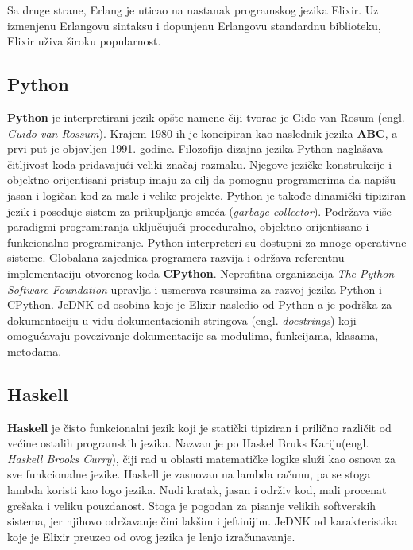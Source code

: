 \documentclass[12pt,oneside]{memoir}
\begin{document}
Sa druge strane, Erlang je uticao na nastanak programskog jezika Elixir. Uz izmenjenu Erlangovu sintaksu i dopunjenu Erlangovu standardnu biblioteku, Elixir uživa široku popularnost.
     
\begin{comment} U funkcionalnom programiranju, funkcije se primenjuju na argumente i vrednosti. Vraćene vrednosti se koriste kao argumenti za druge funkcije. Funkcionalno programiranje je suprotno proceduralnom programiranju, gde se koriste naredbe koje menjaju okruženje programa na neki način, kao što je pripisivanje vrednosti promenljivim. U funkcionalnom programiranju, te promene okruženja se minimizuju korišćenjem vrednosti koje vraća pozvana funkcija kao direktan ulaz u drugu funkciju, bez upotrebe pripisivanja naredbi.\\
\end{comment}

\subsection{Python}
\textbf{Python} je interpretirani jezik opšte namene čiji tvorac je Gido van Rosum (engl. \textit{Guido van Rossum}). Krajem 1980-ih je koncipiran kao naslednik jezika \textbf{ABC}, a prvi put je objavljen 1991. godine. Filozofija dizajna jezika Python naglašava čitljivost koda pridavajući veliki značaj razmaku. Njegove jezičke konstrukcije i objektno-orijentisani pristup imaju za cilj da pomognu programerima da napišu jasan i logičan kod za male i velike projekte. Python je takođe dinamički tipiziran jezik i poseduje sistem za prikupljanje smeća (\textit{garbage collector}). Podržava više paradigmi programiranja uključujući proceduralno, objektno-orijentisano i funkcionalno programiranje. Python interpreteri su dostupni za mnoge operativne sisteme. Globalana zajednica programera razvija i održava referentnu implementaciju otvorenog koda \textbf{CPython}. Neprofitna organizacija \textit{The Python Software Foundation} upravlja i usmerava resursima za razvoj jezika Python i CPython. JeDNK od osobina koje je Elixir nasledio od Python-a je podrška za dokumentaciju u vidu dokumentacionih stringova (engl. \textit{docstrings}) koji omogućavaju povezivanje dokumentacije sa modulima, funkcijama, klasama, metodama.

\subsection{Haskell}
\textbf{Haskell} je čisto funkcionalni jezik koji je statički tipiziran i prilično različit od većine ostalih programskih jezika. Nazvan je po Haskel Bruks Kariju(engl. \textit{Haskell Brooks Curry}), čiji rad u oblasti matematičke logike služi kao osnova za sve funkcionalne jezike. Haskell je zasnovan na lambda računu, pa se stoga lambda koristi kao logo jezika. Nudi kratak, jasan i održiv kod, mali procenat grešaka i veliku pouzdanost. Stoga je pogodan za pisanje velikih softverskih sistema, jer njihovo održavanje čini lakšim i jeftinijim. JeDNK od karakteristika koje je Elixir preuzeo od ovog jezika je lenjo izračunavanje.
\end{document}
